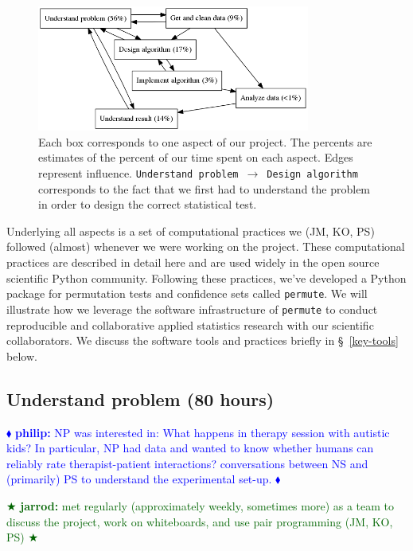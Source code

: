 \documentclass[]{article}
\newcommand{\philip}[1] { \textcolor{blue} {
\ensuremath{\blacklozenge} {\bf philip:}  {#1}
\ensuremath{\blacklozenge} } }
\newcommand{\jarrod}[1] { \textcolor{darkgreen} {
\ensuremath{\bigstar} {\bf jarrod:}  {#1}
\ensuremath{\bigstar} } }
\begin{document}
\begin{figure}[h]
  \centering
    \includegraphics[width=0.8\textwidth]{work_process.png}
  \caption{
  \small
    Each box corresponds to one aspect of our project.
    The percents are estimates of the percent of our time spent on each aspect.
    Edges represent influence. \texttt{Understand problem}~$\to$~\texttt{Design algorithm}
    corresponds to the fact that we first had to understand the problem
    in order to design the correct statistical test.\label{fig:work_process}}
\end{figure}

Underlying all aspects is a set of computational practices
we (JM, KO, PS) followed (almost) whenever we were working on the project.
These computational practices are described in detail
here \cite{millman2014developing} and are used widely
in the open source scientific Python community.
Following these practices, we've developed a Python package for permutation
tests and confidence sets called \texttt{permute}.
We will illustrate how we leverage the software infrastructure of
\texttt{permute} to conduct reproducible and collaborative
applied statistics research with our scientific collaborators.
We discuss the software tools and practices briefly in \S~\ref{key-tools} below.

\subsection{Understand problem (80 hours)}

\philip{
NP was interested in:  What happens in therapy session with autistic kids?
In particular, NP had data and wanted to know whether humans can reliably rate
therapist-patient interactions?
conversations between NS and (primarily) PS to understand the experimental
set-up.
}

\jarrod{
met regularly (approximately weekly, sometimes more) as a team to discuss the
project, work on whiteboards, and use pair programming (JM, KO, PS)
}
\end{document}
